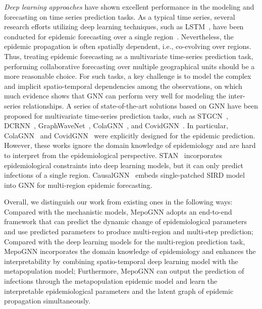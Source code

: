 \documentclass[lettersize,journal]{IEEEtran}
\begin{document}
\textit{Deep learning approaches} have shown excellent performance in the modeling and forecasting on time series prediction tasks. 
As a typical time series, several research efforts utilizing deep learning techniques, such as LSTM~\cite{ref_6,ref_8}, have been conducted for epidemic forecasting over a single region~\cite{ref_6,ref_8,ref_19,ref_20}. Nevertheless, the epidemic propagation is often spatially dependent, i.e., co-evolving over regions. Thus, 
treating epidemic forecasting as a multivariate time-series prediction task, performing collaborative forecasting over multiple geographical units should be a more reasonable choice.
For such tasks, a key challenge is to model the complex and implicit spatio-temporal dependencies among the observations, on which much evidence shows that GNN can perform very well for modeling the inter-series relationships. A series of state-of-the-art solutions based on GNN have been proposed for multivariate time-series prediction tasks, such as STGCN~\cite{ref_21}, DCRNN~\cite{ref_22}, GraphWaveNet~\cite{ref_23}, ColaGNN~\cite{ref_9}, and CovidGNN~\cite{ref_10}. 
In particular, ColaGNN~\cite{ref_9} and CovidGNN~\cite{ref_10} were explicitly designed for the epidemic prediction. However, these works ignore the domain knowledge of epidemiology and are hard to interpret from the epidemiological perspective. STAN~\cite{ref_19} incorporates epidemiological constraints into deep learning models, but it can only predict infections of a single region. CausalGNN~\cite{ref_29} embeds single-patched SIRD model into GNN for multi-region epidemic forecasting.

Overall, we distinguish our work from existing ones in the following ways: 
Compared with the mechanistic models, MepoGNN adopts an end-to-end framework that can predict the dynamic change of epidemiological parameters and use predicted parameters to produce multi-region and multi-step prediction; 
Compared with the deep learning models for the multi-region prediction task, MepoGNN incorporates the domain knowledge of epidemiology and enhances the interpretability by combining spatio-temporal deep learning model with the metapopulation model; 
Furthermore, MepoGNN can output the prediction of infections through the metapopulation epidemic model and learn the interpretable epidemiological parameters and the latent graph of epidemic propagation simultaneously. 
\end{document}
